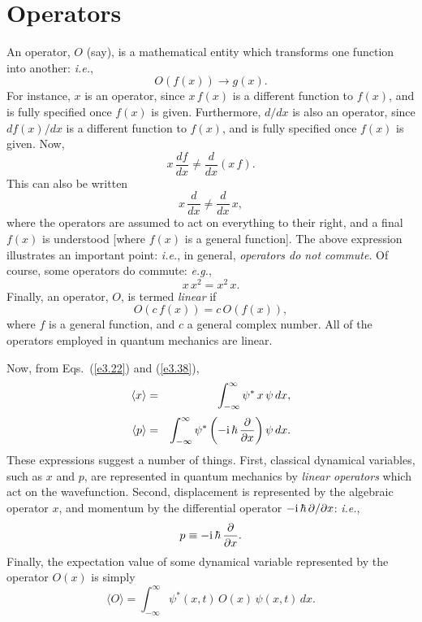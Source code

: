 \section{Operators}\label{s4.6}
An operator, $O$ (say), is a mathematical entity which transforms
one function into another: {\em i.e.},
\begin{equation}
O(f(x))\rightarrow g(x).
\end{equation}
For instance, $x$ is an operator, since $x\,f(x)$ is a different function
to $f(x)$, and is fully specified once $f(x)$ is given. Furthermore,
$d/dx$ is also an operator, since $df(x)/dx$ is a different function
to $f(x)$, and is fully specified once $f(x)$ is given.
Now,
\begin{equation}
x\,\frac{df}{dx} \neq \frac{d}{dx}\left(x\,f\right).
\end{equation}
This can also be written
\begin{equation}
x\,\frac{d}{dx} \neq \frac{d}{dx}\,x,
\end{equation}
where the operators are assumed to act on everything to
their right, and a final $f(x)$ is understood [where $f(x)$ is a general function]. The above expression illustrates
an important point: {\em i.e.}, in general, {\em operators do not
commute}. Of course, some operators do commute: {\em e.g.},
\begin{equation}
x\,x^2 = x^2\,x.
\end{equation}
Finally, an operator, $O$,  is termed {\em linear}\/ if
\begin{equation}
O(c\,f(x)) =c\,O(f(x)),
\end{equation}
where $f$ is a general function, and $c$ a general complex number.
All of the operators employed in quantum mechanics are linear.

Now, from Eqs.~(\ref{e3.22}) and (\ref{e3.38}),
\begin{eqnarray}
\langle x\rangle &=& \int_{-\infty}^{\infty}\psi^\ast\,x\,\psi\,dx,\\[0.5ex]
\langle p\rangle &=& \int_{-\infty}^{\infty}\psi^{\ast}\left(-{\rm i}\,\hbar\,
\frac{\partial}{\partial x}\right)\psi\,dx.
\end{eqnarray}
These expressions suggest a number of things. First, classical dynamical
variables, such as $x$ and $p$, are represented in quantum mechanics
by {\em linear operators}\/ which act on the wavefunction. Second,
displacement is represented by the algebraic operator $x$,
and momentum by the differential operator $-{\rm i}\,\hbar\,\partial/\partial x$: {\em i.e.},
\begin{equation}\label{e3.54}
p  \equiv -{\rm i}\,\hbar\,\frac{\partial}{\partial x}.
\end{equation}
Finally, the expectation value of some dynamical variable represented by
the operator $O(x)$ is simply
\begin{equation}\label{e3.55}
\langle O \rangle = \int_{-\infty}^{\infty}\psi^\ast(x,t)\,O(x)\,\psi(x,t)\,dx.
\end{equation}

